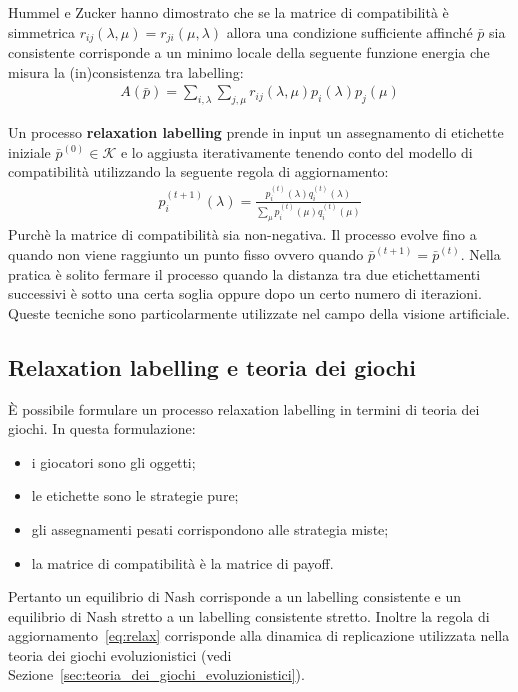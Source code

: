 	Hummel e Zucker hanno dimostrato che se la matrice di compatibilità è simmetrica $r_{ij}(\lambda, \mu) = r_{ji}(\mu, \lambda)$ allora una condizione sufficiente affinché $\bar{p}$ sia consistente corrisponde a un minimo locale della seguente funzione energia che misura la (in)consistenza tra labelling:
	\begin{align*}
		A(\bar{p}) = \sum_{i, \lambda} \sum_{j, \mu} r_{ij}(\lambda, \mu) p_i(\lambda) p_j(\mu)
	\end{align*}
	
	Un processo \textbf{relaxation labelling} prende in input un assegnamento di etichette iniziale $\bar{p}^{(0)} \in \mathcal{K}$ e lo aggiusta iterativamente tenendo conto del modello di compatibilità utilizzando la seguente regola di aggiornamento:
	\begin{align}
		p_i^{(t + 1)}(\lambda) = \frac{p_i^{(t)}(\lambda) q_i^{(t)} (\lambda)}{\displaystyle\sum_\mu p_i^{(t)}(\mu) q_i^{(t)} (\mu)}\label{eq:relax}
	\end{align}
	Purchè la matrice di compatibilità sia non-negativa. Il processo evolve fino a quando non viene raggiunto un punto fisso ovvero quando $\bar{p}^{(t + 1)} = \bar{p}^(t)$. Nella pratica è solito fermare il processo quando la distanza tra due etichettamenti successivi è sotto una certa soglia oppure dopo un certo numero di iterazioni. Queste tecniche sono particolarmente utilizzate nel campo della visione artificiale.
	
	\newpage
	
	\subsection{Relaxation labelling e teoria dei giochi} %
	\label{sub:relaxation_labelling_e_teoria_dei_giochi}
	È possibile formulare un processo relaxation labelling in termini di teoria dei giochi. In questa formulazione:
	\begin{itemize}
		\item i giocatori sono gli oggetti;
		\item le etichette sono le strategie pure;
		\item gli assegnamenti pesati corrispondono alle strategia miste;
		\item la matrice di compatibilità è la matrice di payoff.
	\end{itemize}
	Pertanto un equilibrio di Nash corrisponde a un labelling consistente e un equilibrio di Nash stretto a un labelling consistente stretto. Inoltre la regola di aggiornamento~\eqref{eq:relax} corrisponde alla dinamica di replicazione utilizzata nella teoria dei giochi evoluzionistici (vedi Sezione~\ref{sec:teoria_dei_giochi_evoluzionistici}).\\
	
